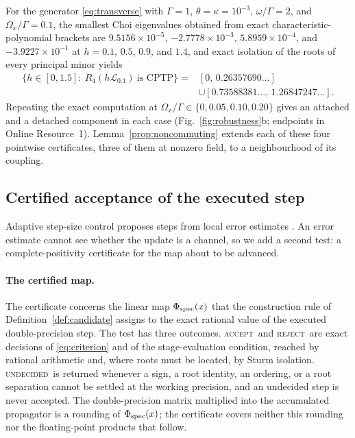 \documentclass[pdflatex,sn-mathphys-num]{sn-jnl}
\newcommand{\Lgen}{\mathcal L}
\newcommand{\PASS}{\textnormal{\textsc{accept}}}
\newcommand{\FAIL}{\textnormal{\textsc{reject}}}
\newcommand{\UNCERTAIN}{\textnormal{\textsc{undecided}}}
\theoremstyle{thmstyleone}
\theoremstyle{thmstylethree}
\theoremstyle{thmstyletwo}
\begin{document}
For the generator \eqref{eq:transverse} with $\Gamma=1$, $\theta=\kappa=10^{-3}$, $\omega/\Gamma=2$, and $\Omega_x/\Gamma=0.1$, the smallest Choi eigenvalues obtained from exact characteristic-polynomial brackets are
\mbox{$9.5156\times10^{-5}$}, \mbox{$-2.7778\times10^{-3}$}, \mbox{$5.8959\times10^{-4}$}, and \mbox{$-3.9227\times10^{-1}$} at $h=0.1$, $0.5$, $0.9$, and $1.4$, and exact isolation of the roots of every principal minor yields
\begin{equation}
\begin{aligned}
 \{h\in[0,1.5]:\ R_4(h\Lgen_{0.1})\ \text{is CPTP}\}
 ={}&[0,\,0.26357690\ldots]\\
 &\cup[0.73588381\ldots,\,1.26847247\ldots].
\end{aligned}
 \label{eq:noncommuting_set}
\end{equation}
Repeating the exact computation at $\Omega_x/\Gamma\in\{0,0.05,0.10,0.20\}$ gives an attached and a detached component in each case (Fig.~\ref{fig:robustness}b; endpoints in Online Resource~1). Lemma~\ref{prop:noncommuting} extends each of these four pointwise certificates, three of them at nonzero field, to a neighbourhood of its coupling.

\subsection{Certified acceptance of the executed step}\label{sec:certified}

Adaptive step-size control proposes steps from local error estimates \cite{DormandPrince1980,HairerNorsettWanner1993,Shampine1985Doubling,Soderlind2002}. An error estimate cannot see whether the update is a channel, so we add a second test: a complete-positivity certificate for the map about to be advanced.

\paragraph{The certified map.} The certificate concerns the linear map $\Phi_{\rm spec}(x)$ that the construction rule of Definition~\ref{def:candidate} assigns to the exact rational value of the executed double-precision step. The test has three outcomes. \PASS\ and \FAIL\ are exact decisions of \eqref{eq:criterion} and of the stage-evaluation condition, reached by rational arithmetic and, where roots must be located, by Sturm isolation. \UNCERTAIN\ is returned whenever a sign, a root identity, an ordering, or a root separation cannot be settled at the working precision, and an undecided step is never accepted. The double-precision matrix multiplied into the accumulated propagator is a rounding of $\Phi_{\rm spec}(x)$; the certificate covers neither this rounding nor the floating-point products that follow.
\end{document}
